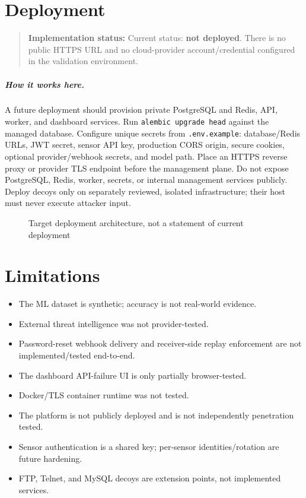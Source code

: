 \documentclass[11pt,oneside]{book}
\newcommand{\how}[1]{\paragraph{How it works here.}#1}
\newcommand{\statusnote}[1]{\begin{quote}\colorbox{hplight}{\parbox{0.92\linewidth}{\textbf{Implementation status:} #1}}\end{quote}}
\begin{document}
\chapter{Deployment}
\statusnote{Current status: \textbf{not deployed}. There is no public HTTPS URL and no cloud-provider account/credential configured in the validation environment.}
\how{A future deployment should provision private PostgreSQL and Redis, API, worker, and dashboard services. Run \texttt{alembic upgrade head} against the managed database. Configure unique secrets from \texttt{.env.example}: database/Redis URLs, JWT secret, sensor API key, production CORS origin, secure cookies, optional provider/webhook secrets, and model path. Place an HTTPS reverse proxy or provider TLS endpoint before the management plane. Do not expose PostgreSQL, Redis, worker, secrets, or internal management services publicly. Deploy decoys only on separately reviewed, isolated infrastructure; their host must never execute attacker input.}
\begin{figure}[h]\centering{}\caption{Target deployment architecture, not a statement of current deployment}\end{figure}

\chapter{Limitations}
\begin{itemize}[leftmargin=*]\item The ML dataset is synthetic; accuracy is not real-world evidence.\item External threat intelligence was not provider-tested.\item Password-reset webhook delivery and receiver-side replay enforcement are not implemented/tested end-to-end.\item The dashboard API-failure UI is only partially browser-tested.\item Docker/TLS container runtime was not tested.\item The platform is not publicly deployed and is not independently penetration tested.\item Sensor authentication is a shared key; per-sensor identities/rotation are future hardening.\item FTP, Telnet, and MySQL decoys are extension points, not implemented services.\end{itemize}
\end{document}
